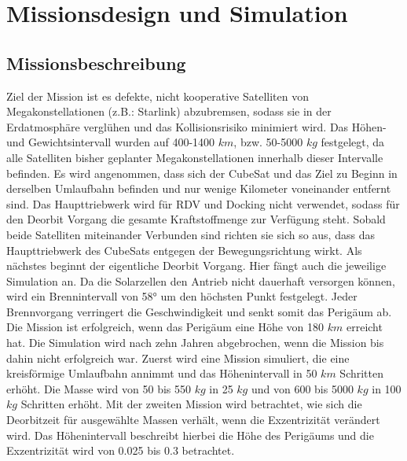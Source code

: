 \chapter{Missionsdesign und Simulation}


\section{Missionsbeschreibung}

Ziel der Mission ist es defekte, nicht kooperative Satelliten von Megakonstellationen (z.B.: Starlink) abzubremsen, sodass sie in der Erdatmosphäre verglühen und das Kollisionsrisiko minimiert wird. Das Höhen- und Gewichtsintervall wurden auf 400-1400 $km$, bzw. 50-5000 $kg$ festgelegt, da alle Satelliten bisher geplanter Megakonstellationen innerhalb dieser Intervalle befinden.
Es wird angenommen, dass sich der CubeSat und das Ziel zu Beginn in derselben Umlaufbahn befinden und nur wenige Kilometer voneinander entfernt sind. Das Haupttriebwerk wird für RDV und Docking nicht verwendet, sodass für den Deorbit Vorgang die gesamte Kraftstoffmenge zur Verfügung steht. Sobald beide Satelliten miteinander Verbunden sind richten sie sich so aus, dass das Haupttriebwerk des CubeSats entgegen der Bewegungsrichtung wirkt. Als nächstes beginnt der eigentliche Deorbit Vorgang. Hier fängt auch die jeweilige Simulation an. Da die Solarzellen den Antrieb nicht dauerhaft versorgen können, wird ein Brennintervall von 58° um den höchsten Punkt festgelegt. Jeder Brennvorgang verringert die Geschwindigkeit und senkt somit das Perigäum ab. Die Mission ist erfolgreich, wenn das Perigäum eine Höhe von 180 $km$ erreicht hat. Die Simulation wird nach zehn Jahren abgebrochen, wenn die Mission bis dahin nicht erfolgreich war. 
Zuerst wird eine Mission simuliert, die eine kreisförmige Umlaufbahn annimmt und das Höhenintervall in 50 $km$ Schritten erhöht. Die Masse wird von 50 bis 550 $kg$ in 25 $kg$ und von 600 bis 5000 $kg$ in 100 $kg$ Schritten erhöht.
Mit der zweiten Mission wird betrachtet, wie sich die Deorbitzeit für ausgewählte Massen verhält, wenn die Exzentrizität verändert wird. Das Höhenintervall beschreibt hierbei die Höhe des Perigäums und die Exzentrizität wird von 0.025 bis 0.3 betrachtet.
	
